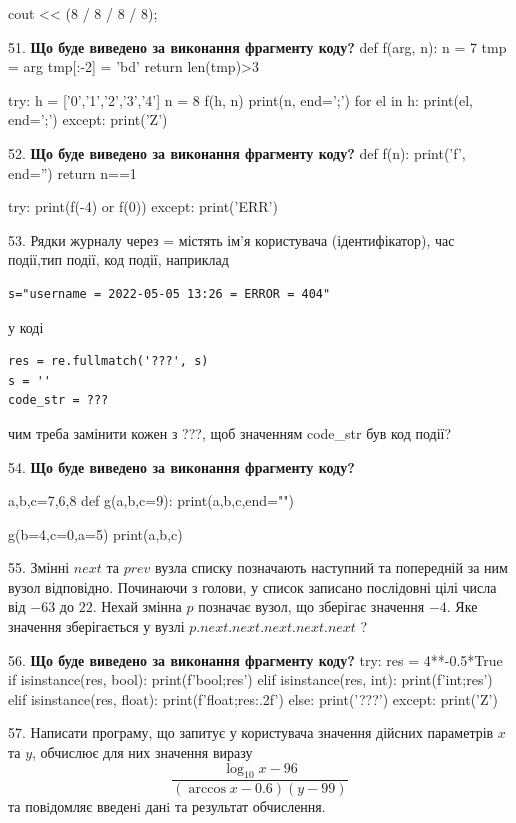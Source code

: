 \documentclass[11pt]{article}
\begin{document}
cout << (8 / 8 / 8 / 8);
\par\vspace{5mm}
51. \textbf{Що буде виведено за виконання фрагменту коду?}
def f(arg, n):
    n = 7
    tmp = arg
    tmp[:-2] = 'bd'
    return len(tmp)>3

try:
    h = ['0','1','2','3','4']
    n = 8
    f(h, n)
    print(n, end=';')
    for el in h:
        print(el, end=';')
except:
    print('Z')
\par\vspace{5mm}
52. \textbf{Що буде виведено за виконання фрагменту коду?}
def f(n):
    print('f', end='')
    return n==1

try:
    print(f(-4) or f(0))
except:
    print('ERR')
\par\vspace{5mm}
53. 
Рядки журналу через = містять ім'я користувача (ідентифікатор), час події,тип події, код події, наприклад
\begin{verbatim}
s="username = 2022-05-05 13:26 = ERROR = 404"
\end{verbatim}
у коді 
\begin{verbatim}
res = re.fullmatch('???', s) 
s = ''
code_str = ??? 
\end{verbatim}
чим треба замінити кожен з ???, щоб значенням code\_str був код події? 


\par\vspace{5mm}
54. \textbf{Що буде виведено за виконання фрагменту коду?}

a,b,c=7,6,8
def g(a,b,c=9):
    print(a,b,c,end="")

g(b=4,c=0,a=5)
print(a,b,c)

\par\vspace{5mm}
55. 
Змінні $next$ та $prev$ вузла списку позначають наступний та попередній за ним вузол відповідно. Починаючи з голови, у список записано послідовні цілі числа від $-63$ до $22$. Нехай змінна $p$ позначає вузол, що зберігає значення $-4$.
Яке значення зберігається у вузлі $p.next.next.next.next.next$ ?
\par\vspace{5mm}
56. \textbf{Що буде виведено за виконання фрагменту коду?}
try:
    res = 4**-0.5*True
    if isinstance(res, bool):
        print(f'bool;{res}')
    elif isinstance(res, int):
        print(f'int;{res}')
    elif isinstance(res, float):
        print(f'float;{res:.2f}')
    else:
        print('???')
except:
    print('Z')
\par\vspace{5mm}
57. 
Написати програму, що запитує у користувача значення дійсних параметрів $x$ та $y$, обчислює для них значення виразу 
$$\frac{\log_{10} x - 96}{(\arccos x - 0.6) (y - 99)}$$ 
та повiдомляє введенi данi та результат обчислення.
\end{document}
